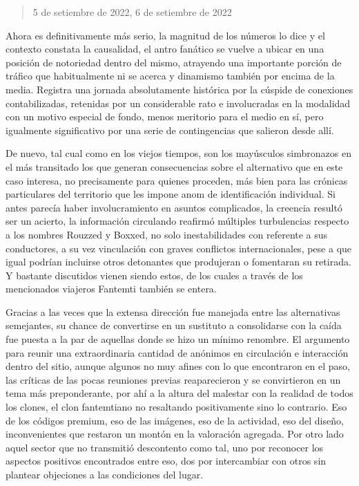 \documentclass[
]{book}
\begin{document}
\begin{quote}
5 de setiembre de 2022, 6 de setiembre de 2022
\end{quote}

Ahora es definitivamente más serio, la magnitud de los números lo dice y el contexto constata la causalidad, el antro fanático se vuelve a ubicar en una posición de notoriedad dentro del mismo, atrayendo una importante porción de tráfico que habitualmente ni se acerca y dinamismo también por encima de la media. Registra una jornada absolutamente histórica por la cúspide de conexiones contabilizadas, retenidas por un considerable rato e involucradas en la modalidad con un motivo especial de fondo, menos meritorio para el medio en sí, pero igualmente significativo por una serie de contingencias que salieron desde allí.

De nuevo, tal cual como en los viejos tiempos, son los mayúsculos simbronazos en el más transitado los que generan consecuencias sobre el alternativo que en este caso interesa, no precisamente para quienes proceden, más bien para las crónicas particulares del territorio que les impone anom de identificación individual. Si antes parecía haber involucramiento en asuntos complicados, la creencia resultó ser un acierto, la información circulando reafirmó múltiples turbulencias respecto a los nombres Rouzzed y Boxxed, no solo inestabilidades con referente a sus conductores, a su vez vinculación con graves conflictos internacionales, pese a que igual podrían incluirse otros detonantes que produjeran o fomentaran su retirada. Y bastante discutidos vienen siendo estos, de los cuales a través de los mencionados viajeros Fantemti también se entera.

Gracias a las veces que la extensa dirección fue manejada entre las alternativas semejantes, su chance de convertirse en un sustituto a consolidarse con la caída fue puesta a la par de aquellas donde se hizo un mínimo renombre. El argumento para reunir una extraordinaria cantidad de anónimos en circulación e interacción dentro del sitio, aunque algunos no muy afines con lo que encontraron en el paso, las críticas de las pocas reuniones previas reaparecieron y se convirtieron en un tema más preponderante, por ahí a la altura del malestar con la realidad de todos los clones, el clon fantemtiano no resaltando positivamente sino lo contrario. Eso de los códigos premium, eso de las imágenes, eso de la actividad, eso del diseño, inconvenientes que restaron un montón en la valoración agregada. Por otro lado aquel sector que no transmitió descontento como tal, uno por reconocer los aspectos positivos encontrados entre eso, dos por intercambiar con otros sin plantear objeciones a las condiciones del lugar.
\end{document}
